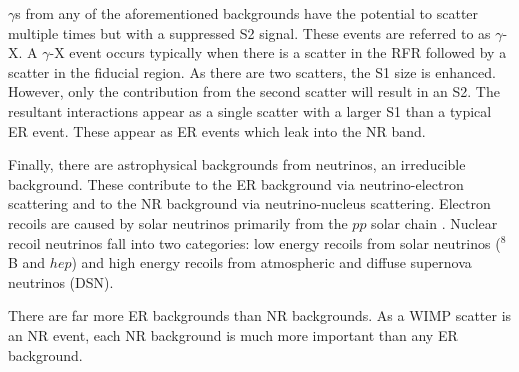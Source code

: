 \par
$\gamma$s from any of the aforementioned backgrounds have the potential to scatter multiple times but with a suppressed S2 signal.
These events are referred to as $\gamma$-X.
A $\gamma$-X event occurs typically when there is a scatter in the RFR followed by a scatter in the fiducial region.
As there are two scatters, the S1 size is enhanced.
However, only the contribution from the second scatter will result in an S2.
The resultant interactions appear as a single scatter with a larger S1 than a typical ER event.
These appear as ER events which leak into the NR band.


\par
Finally, there are astrophysical backgrounds from neutrinos, an irreducible background.%
These contribute to the ER background via neutrino-electron scattering and to the NR background via neutrino-nucleus scattering.
Electron recoils are caused by solar neutrinos primarily from the $pp$ solar chain \cite{solar_neutrinos_ref}.
Nuclear recoil neutrinos fall into two categories: low energy recoils from solar neutrinos ($^{8}$B and $hep$) and high energy recoils from atmospheric and diffuse supernova neutrinos (DSN).

\par
There are far more ER backgrounds than NR backgrounds.
As a WIMP scatter is an NR event, each NR background is much more important than any ER background.

